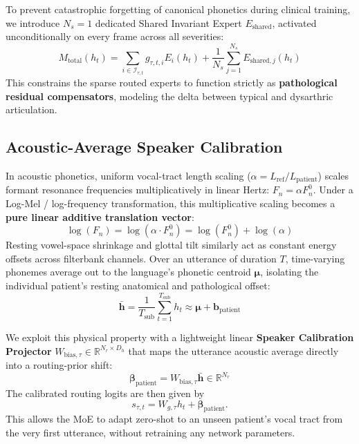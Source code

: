 \documentclass[10pt,twocolumn]{article}
\begin{document}
To prevent catastrophic forgetting of canonical phonetics during clinical training, we introduce $N_s = 1$ dedicated Shared Invariant Expert $E_{\text{shared}}$, activated unconditionally on every frame across all severities:
\begin{equation}
    M_{\text{total}}(h_t) = \sum_{i \in \mathcal{I}_{\tau, t}} g_{\tau, t, i} E_i(h_t) + \frac{1}{N_s} \sum_{j=1}^{N_s} E_{\text{shared}, j}(h_t)
\end{equation}
This constrains the sparse routed experts to function strictly as \textbf{pathological residual compensators}, modeling the delta between typical and dysarthric articulation.

\subsection{Acoustic-Average Speaker Calibration}

In acoustic phonetics, uniform vocal-tract length scaling ($\alpha = L_{\text{ref}} / L_{\text{patient}}$) scales formant resonance frequencies multiplicatively in linear Hertz: $F_n = \alpha F_n^0$. Under a Log-Mel / log-frequency transformation, this multiplicative scaling becomes a \textbf{pure linear additive translation vector}:
\begin{equation}
    \log(F_n) = \log(\alpha \cdot F_n^0) = \log(F_n^0) + \log(\alpha)
\end{equation}
Resting vowel-space shrinkage and glottal tilt similarly act as constant energy offsets across filterbank channels. Over an utterance of duration $T$, time-varying phonemes average out to the language's phonetic centroid $\bm{\mu}$, isolating the individual patient's resting anatomical and pathological offset:
\begin{equation}
    \bar{\bm{h}} = \frac{1}{T_{\text{sub}}} \sum_{t=1}^{T_{\text{sub}}} h_t \approx \bm{\mu} + \bm{b}_{\text{patient}}
\end{equation}

We exploit this physical property with a lightweight linear \textbf{Speaker Calibration Projector} $W_{\text{bias}, \tau} \in \mathbb{R}^{N_r \times D_h}$ that maps the utterance acoustic average directly into a routing-prior shift:
\begin{equation}
    \bm{\beta}_{\text{patient}} = W_{\text{bias}, \tau} \bar{\bm{h}} \in \mathbb{R}^{N_r}
\end{equation}
The calibrated routing logits are then given by
\begin{equation}
    s_{\tau, t} = W_{g, \tau} h_t + \bm{\beta}_{\text{patient}}.
\end{equation}
This allows the MoE to adapt zero-shot to an unseen patient's vocal tract from the very first utterance, without retraining any network parameters.
\end{document}
